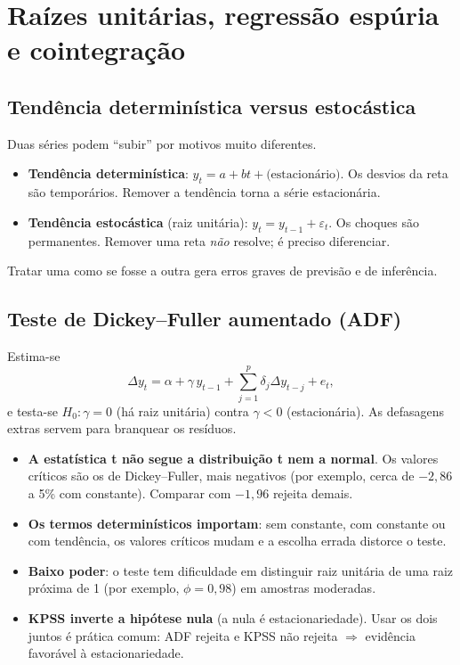 \chapter{Raízes unitárias, regressão espúria e cointegração}
\label{cap:ur}

\section{Tendência determinística versus estocástica}
Duas séries podem ``subir'' por motivos muito diferentes.
\begin{itemize}[leftmargin=1.4em]
\item \textbf{Tendência determinística}: $y_t=a+bt+\text{(estacionário)}$. Os desvios da reta são temporários. Remover a tendência torna a série estacionária.
\item \textbf{Tendência estocástica} (raiz unitária): $y_t=y_{t-1}+\varepsilon_t$. Os choques são permanentes. Remover uma reta \emph{não} resolve; é preciso diferenciar.
\end{itemize}
Tratar uma como se fosse a outra gera erros graves de previsão e de inferência.

\section{Teste de Dickey--Fuller aumentado (ADF)}
Estima-se
\[
\Delta y_t=\alpha+\gamma\,y_{t-1}+\sum_{j=1}^{p}\delta_j\Delta y_{t-j}+e_t,
\]
e testa-se $H_0:\gamma=0$ (há raiz unitária) contra $\gamma<0$ (estacionária). As defasagens extras servem para branquear os resíduos.

\begin{atencao}
\begin{itemize}[leftmargin=1.2em]
\item \textbf{A estatística t não segue a distribuição t nem a normal}. Os valores críticos são os de Dickey--Fuller, mais negativos (por exemplo, cerca de $-2{,}86$ a 5\% com constante). Comparar com $-1{,}96$ rejeita demais.
\item \textbf{Os termos determinísticos importam}: sem constante, com constante ou com tendência, os valores críticos mudam e a escolha errada distorce o teste.
\item \textbf{Baixo poder}: o teste tem dificuldade em distinguir raiz unitária de uma raiz próxima de 1 (por exemplo, $\phi=0{,}98$) em amostras moderadas.
\item \textbf{KPSS inverte a hipótese nula} (a nula é estacionariedade). Usar os dois juntos é prática comum: ADF rejeita e KPSS não rejeita $\Rightarrow$ evidência favorável à estacionariedade.
\end{itemize}
\end{atencao}

